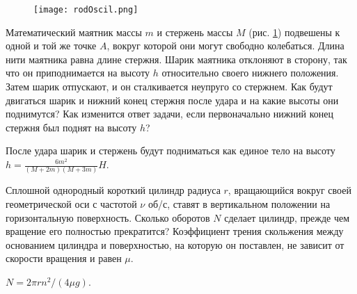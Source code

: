\begin{ex} %

\begin{figure}[h]
\centering
\texttt{[image: rodOscil.png]}
\caption{}
\label{rodOscil}
\end{figure}

Математический маятник массы $m$ и стержень массы $M$ (рис. \ref{rodOscil}) подвешены к одной и той же точке $A$, вокруг которой они могут свободно колебаться. Длина нити маятника равна длине стержня. Шарик маятника отклоняют в сторону, так что он приподнимается на высоту $h$ относительно своего нижнего положения. Затем шарик отпускают, и он сталкивается неупруго со стержнем. Как будут двигаться шарик и нижний конец стержня после удара и на какие высоты они поднимутся? Как изменится ответ задачи, если первоначально нижний конец стержня был поднят на высоту $h$?
\begin{ans}
После удара шарик и стержень будут подниматься как единое тело на высоту $h = \frac{6m^2}{(M+2m)(M+3m)}H$.
\end{ans}
\end{ex}	

\begin{ex} %
Сплошной однородный короткий цилиндр радиуса $r$, вращающийся вокруг своей геометрической оси с частотой $\nu$ об/с, ставят в вертикальном положении на горизонтальную поверхность. Сколько оборотов $N$ сделает цилиндр, прежде чем вращение его полностью прекратится? Коэффициент трения скольжения между основанием цилиндра и поверхностью, на которую он поставлен, не зависит от скорости вращения и равен $\mu$.
\begin{ans}
$N = 2\pi r n^2/(4 \mu g)$.
\end{ans}
\end{ex}	

\clearpage